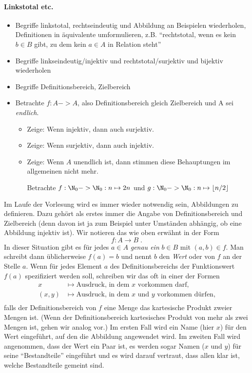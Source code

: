 \begin{tutorium}
\noindent
  \paragraph{Linkstotal etc.}
  \begin{itemize}
  \item Begriffe linkstotal, rechtseindeutig und Abbildung an
    Beispielen wiederholen, Definitionen in äquivalente umformulieren,
    z.B. "`rechtstotal, wenn es kein $b\in B$ gibt, zu dem kein $a\in
    A$ in Relation steht"'
  \item Begriffe linkseindeutig/injektiv und rechtstotal/surjektiv und
    bijektiv wiederholen
  \item Begriffe Definitionsbereich, Zielbereich \\
  \item Betrachte $f:A -> A$, also Definitionsbereich gleich Zielbereich
    und A sei \emph{endlich}.
    \begin{itemize}
    \item Zeige: Wenn injektiv, dann auch surjektiv.
    \item Zeige: Wenn surjektiv, dann auch injektiv.
    \item Zeige: Wenn $A$ unendlich ist, dann stimmen diese
      Behauptungen im allgemeinen nicht mehr.

      Betrachte \zB $f:\N_0->\N_0: n \mapsto 2n$ und $g:\N_0->\N_0: n
      \mapsto \lfloor n/2\rfloor$
    \end{itemize}
  \end{itemize}
\end{tutorium}

\noindent
Im Laufe der Vorlesung wird es immer wieder notwendig sein, Abbildungen
zu definieren.
%
Dazu gehört als erstes immer die Angabe von Definitionsbereich und
Zielbereich (denn davon ist ja zum Beispiel unter Umständen abhängig,
ob eine Abbildung injektiv ist).
%
Wir notieren das wie oben erwähnt in der Form
\[
  f \colon A \to B \;.
\]
%
In dieser Situation gibt es für jedes $a\in A$
\emph{genau ein} $b\in B$ mit $(a,b)\in f$.
%
Man schreibt dann üblicherweise $f(a)=b$
und nennt $b$
den \emph{Wert} oder  von $f$
an der Stelle $a$.
%
Wenn für jedes Element $a$ des Definitionsbereichs der Funktionswert
$f(a)$ spezifiziert werden soll, schreiben wir das oft in einer der
Formen
%
\begin{align*}
  x &\mapsto \text{Ausdruck, in dem $x$ vorkommen darf,} \\
  (x,y) &\mapsto \text{Ausdruck, in dem $x$ und $y$ vorkommen dürfen,} \\
\end{align*}
%
falls der Definitionsbereich von $f$ eine Menge \bzw das kartesische
Produkt zweier Mengen ist.
%
(Wenn der Definitionsbereich kartesisches Produkt von mehr als zwei
Mengen ist, gehen wir analog vor.)
%
Im ersten Fall wird ein Name (hier $x$)
für den Wert eingeführt, auf den die Abbildung angewendet wird.
%
Im zweiten Fall wird angenommen, dass der Wert ein Paar ist, es werden sogar
Namen ($x$ und $y$)
für seine "`Bestandteile"' eingeführt und es wird darauf vertraut, dass
allen klar ist, welche Bestandteile gemeint sind.

